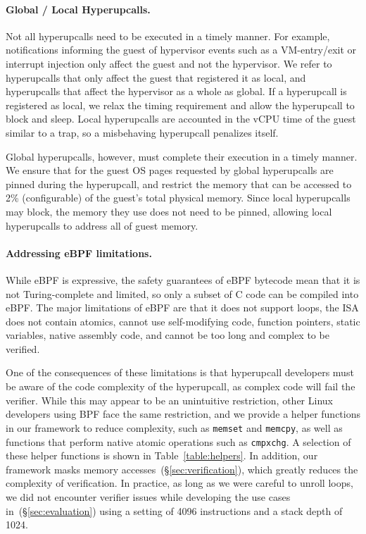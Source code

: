 \documentclass[11pt]{article}
\newcommand{\Hypercallback}{Hyperupcall\xspace{}}
\newcommand{\hypercallback}{hyperupcall\xspace{}}
\begin{document}
\paragraph{Global / Local \Hypercallback{s}.} Not all \hypercallback{s} need 
to be executed in a timely manner. For example, notifications informing the 
guest of hypervisor events such as a VM-entry/exit or interrupt injection 
only affect the guest and not the hypervisor. We refer to  \hypercallback{s} 
that only affect the guest that registered it as local, and \hypercallback{s} 
that affect the hypervisor as a whole as global. If a \hypercallback{} is 
registered as local, we relax the timing requirement and allow the 
\hypercallback{} to block and sleep. Local \hypercallback{s} are accounted 
in the vCPU time of the guest similar to a trap, so a misbehaving \hypercallback{} 
penalizes itself. 

Global \hypercallback{s}, however, must complete their execution in a timely manner. 
We ensure that for the guest OS pages requested by global \hypercallback{}s are 
pinned during the \hypercallback, and restrict the memory that can be accessed 
to 2\%  (configurable) of the guest's total physical memory.
Since local \hypercallback{s} may block, the memory
 they use does not need to be pinned, allowing local \hypercallback{s}
  to address all of guest memory.


\paragraph{Addressing eBPF limitations.} While eBPF is 
expressive, the safety guarantees of eBPF bytecode mean that it is not
 Turing-complete and limited, so only a subset of C 
 code can be compiled into eBPF. The major limitations of eBPF are 
 that it does not support loops, the ISA does not contain atomics,
  cannot use self-modifying code, function pointers, static variables, 
  native assembly code, and cannot be too long and complex to be verified.

One of the consequences of these limitations is that \hypercallback{} 
developers must be aware of the code complexity of the \hypercallback, 
as complex code will fail the verifier. While this may appear to be an 
unintuitive restriction, other Linux developers using BPF face the same 
restriction, and we provide a helper functions in our framework 
to reduce complexity, such as \texttt{memset} and \texttt{memcpy}, as well as
functions that perform native atomic operations such as \texttt{cmpxchg}. 
A selection of these helper functions is shown in Table~\ref{table:helpers}.
In addition, our framework masks memory accesses~(\S\ref{sec:verification}), 
which greatly reduces the complexity of verification. In practice, as
long as we were careful to unroll loops, we did not encounter verifier 
issues while developing the use cases in~(\S\ref{sec:evaluation}) using 
a setting of 4096 instructions and a stack depth of 1024.
\end{document}
